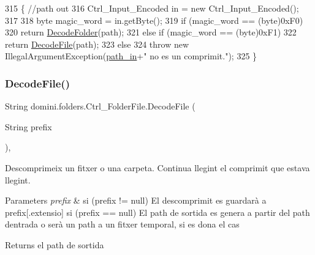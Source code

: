 \begin{DoxyCode}
315                                        \{ \textcolor{comment}{//path out}
316         Ctrl\_Input\_Encoded in = \textcolor{keyword}{new} Ctrl\_Input\_Encoded();
317 
318         byte magic\_word = in.getByte();
319         \textcolor{keywordflow}{if} (magic\_word == (byte)0xF0)
320             \textcolor{keywordflow}{return} \hyperlink{classdomini_1_1folders_1_1Ctrl__FolderFile_ae8f46feaced983c27c6537794f823dd8}{DecodeFolder}(path);
321         \textcolor{keywordflow}{else} \textcolor{keywordflow}{if} (magic\_word == (byte)0xF1) 
322             \textcolor{keywordflow}{return} \hyperlink{classdomini_1_1folders_1_1Ctrl__FolderFile_aa12178fff5fbb832759b7328cbdb4415}{DecodeFile}(path);
323         \textcolor{keywordflow}{else}
324             \textcolor{keywordflow}{throw} \textcolor{keyword}{new} IllegalArgumentException(\hyperlink{classdomini_1_1folders_1_1Ctrl__FolderFile_a0d3946bb2832a1f34d0c2227df5c71c4}{path\_in}+\textcolor{stringliteral}{" no es un comprimit."});
325     \}
\end{DoxyCode}
\mbox{\label{classdomini_1_1folders_1_1Ctrl__FolderFile_aa12178fff5fbb832759b7328cbdb4415}} 
\subsubsection{\texorpdfstring{Decode\+File()}{DecodeFile()}}
{\footnotesize\ttfamily String domini.\+folders.\+Ctrl\+\_\+\+Folder\+File.\+Decode\+File (\begin{DoxyParamCaption}\item[{String}]{prefix }\end{DoxyParamCaption})\hspace{0.3cm}{\ttfamily [inline]}, {\ttfamily [private]}}



Descomprimeix un fitxer o una carpeta. Continua llegint el comprimit que estava llegint. 


\begin{DoxyParams}{Parameters}
{\em prefix} & si (prefix != null) El descomprimit es guardarà a prefix\mbox{[}.extensio\mbox{]} si (prefix == null) El path de sortida es genera a partir del path d\textquotesingle{}entrada o serà un path a un fitxer temporal, si es dona el cas \\
\hline
\end{DoxyParams}
\begin{DoxyReturn}{Returns}
el path de sortida 
\end{DoxyReturn}

